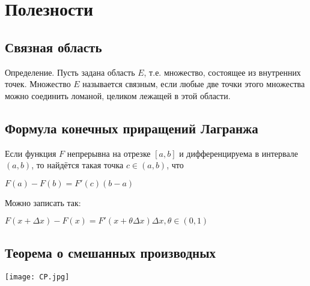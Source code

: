 \documentclass{article}
\begin{document}
\newpage
\section*{Полезности}
\subsection*{Связная область}\label{eq4}
Определение. Пусть задана область $E$, т.е. множество, состоящее из внутренних точек. Множество $E$ называется связным, если любые две точки этого
множества можно соединить ломаной, целиком лежащей в этой области.

\subsection*{Формула конечных приращений Лагранжа}\label{eq5}	
Если функция $F$ непрерывна на отрезке $[a,b]$  и дифференцируема в интервале $(a,b)$, то найдётся такая точка $ c\in (a,b)$, что
 
	$F(a) - F(b) = F'(c)(b - a)$
	
	Можно записать так:
	
	$F(x + \Delta x) - F(x) = F'(x + \theta\Delta x)\Delta x , \theta \in (0,1) $

\subsection*{Теорема о смешанных производных}\label{eq6}
\texttt{[image: CP.jpg]}	
\end{document}
